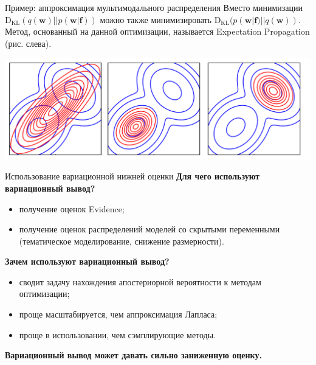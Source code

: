 \documentclass[10pt,pdf,utf8,russian,aspectratio=169]{beamer}
\begin{document}
\begin{frame}{Пример: аппроксимация мультимодального распределения}
Вместо минимизации $\text{D}_\text{KL} (q(\mathbf{w})||p(\mathbf{w}|\mathbf{f}))$ можно также минимизировать $\text{D}_\text{KL} (p(\mathbf{w}|\mathbf{f})||q(\mathbf{w}))$. Метод, основанный на данной оптимизации, называется Expectation Propagation (рис. слева).

\includegraphics[width=\textwidth]{bishop.png}

\end{frame}



\begin{frame}{Использование вариационной нижней оценки}
\textbf{Для чего используют вариационный вывод?}
\begin{itemize}
\item получение оценок Evidence;
\item получение оценок распределений моделей со скрытыми переменными (тематическое моделирование, снижение размерности).
\end{itemize}

\textbf{Зачем используют вариационный вывод?}
\begin{itemize}
\item сводит задачу нахождения апостериорной вероятности к методам оптимизации;
\item проще масштабируется, чем аппроксимация Лапласа;
\item проще в использовании, чем сэмплирующие методы.
\end{itemize}
\textbf{Вариационный вывод может давать сильно заниженную оценку.}
\end{frame}
\end{document}
